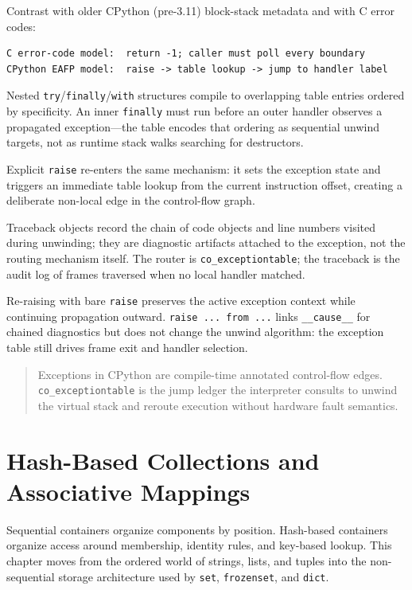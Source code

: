 \documentclass[a4paper,twoside]{report}
\begin{document}
Contrast with older CPython (pre-3.11) block-stack metadata and with C error codes:

\begin{verbatim}
C error-code model:  return -1; caller must poll every boundary
CPython EAFP model:  raise -> table lookup -> jump to handler label
\end{verbatim}

Nested \texttt{try}/\texttt{finally}/\texttt{with} structures compile to overlapping table entries ordered by specificity. An inner \texttt{finally} must run before an outer handler observes a propagated exception---the table encodes that ordering as sequential unwind targets, not as runtime stack walks searching for destructors.

Explicit \texttt{raise} re-enters the same mechanism: it sets the exception state and triggers an immediate table lookup from the current instruction offset, creating a deliberate non-local edge in the control-flow graph.

Traceback objects record the chain of code objects and line numbers visited during unwinding; they are diagnostic artifacts attached to the exception, not the routing mechanism itself. The router is \texttt{co\_exceptiontable}; the traceback is the audit log of frames traversed when no local handler matched.

Re-raising with bare \texttt{raise} preserves the active exception context while continuing propagation outward. \texttt{raise ... from ...} links \texttt{\_\_cause\_\_} for chained diagnostics but does not change the unwind algorithm: the exception table still drives frame exit and handler selection.

\begin{quote}
Exceptions in CPython are compile-time annotated control-flow edges. \texttt{co\_exceptiontable} is the jump ledger the interpreter consults to unwind the virtual stack and reroute execution without hardware fault semantics.
\end{quote}


\chapter{Hash-Based Collections and Associative Mappings}

Sequential containers organize components by position. Hash-based containers organize access around membership, identity rules, and key-based lookup. This chapter moves from the ordered world of strings, lists, and tuples into the non-sequential storage architecture used by \texttt{set}, \texttt{frozenset}, and \texttt{dict}.
\end{document}
